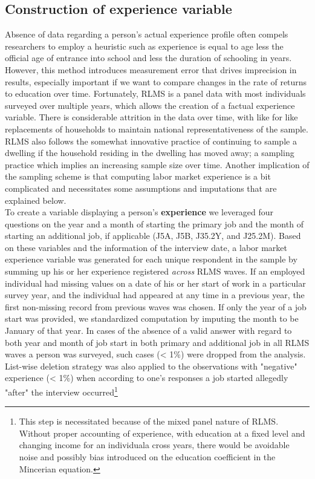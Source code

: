 \documentclass[12pt,a4paper]{article}
\begin{document}
\subsection*{Construction of experience variable}

Absence of data regarding a person's actual experience profile often compels researchers to employ a heuristic such as experience is equal to age less the official age of entrance into school and less the duration of schooling in years. However, this method introduces measurement error that drives imprecision in results, especially important if we want to compare changes in the rate of returns to education over time. Fortunately,  RLMS is a panel data with most individuals surveyed over multiple years, which allows the creation of a factual experience variable. There is considerable attrition in the data over time, with like for like replacements of households to maintain national representativeness of the sample. RLMS also follows the somewhat innovative practice of continuing to sample a dwelling if the household residing in the dwelling has moved away; a sampling practice which implies an increasing sample size over time. Another implication of the sampling scheme is that computing labor market experience is a bit complicated and necessitates some assumptions and imputations that are explained below. \\


To create a variable displaying a person's {\bf experience} we leveraged four questions on the year and a month of starting the primary job and the month of starting an additional job, if applicable (J5A, J5B, J35.2Y, and J25.2M). Based on these variables and the information of the interview date, a labor market experience variable was generated for each unique respondent in the sample by summing up his or her experience registered \textit{across} RLMS waves. If an employed individual had missing values on a date of his or her start of work in a particular survey year, and the individual had appeared at any time in a previous year, the first non-missing record from previous waves was chosen. If only the year of a job start was provided, we standardized computation by imputing the month to be January of that year. In cases of the absence of a valid answer with regard to both year and month of job start in both primary and additional job in all RLMS waves a person was surveyed, such cases (< 1\%) were dropped from the analysis. List-wise deletion strategy was also applied to the observations with "negative" experience (< 1\%) when according to one's responses a job started allegedly "after" the interview occurred\footnote{This step is necessitated because of the mixed panel nature of RLMS. Without proper accounting of experience, with education at a fixed level and changing income for an individuala cross years, there would be avoidable noise and possibly bias introduced on the education coefficient in the Mincerian equation.} 
\\
\end{document}
